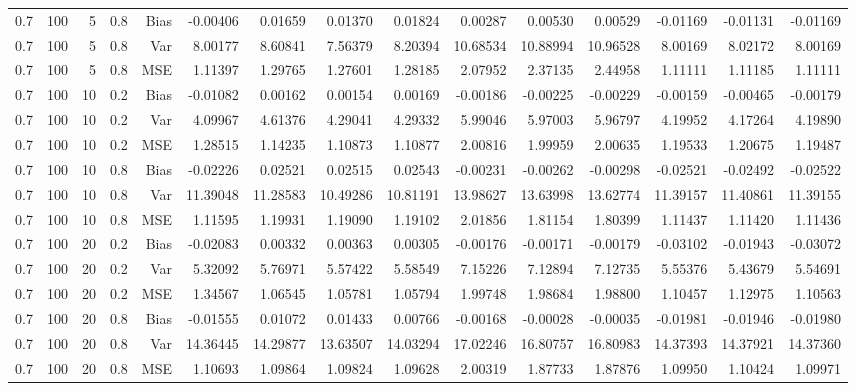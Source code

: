 \begin{table}[!htbp]
\begin{tabular}{lrrrrrrrrrrrrrr}
0.7 & 100 &  5 & 0.8 & Bias & -0.00406 & 0.01659 & 0.01370 & 0.01824 & 0.00287 & 0.00530 & 0.00529 & -0.01169 & -0.01131 & -0.01169 \\
0.7 & 100 &  5 & 0.8 & Var & 8.00177 & 8.60841 & 7.56379 & 8.20394 & 10.68534 & 10.88994 & 10.96528 & 8.00169 & 8.02172 & 8.00169 \\
0.7 & 100 &  5 & 0.8 & MSE & 1.11397 & 1.29765 & 1.27601 & 1.28185 & 2.07952 & 2.37135 & 2.44958 & 1.11111 & 1.11185 & 1.11111 \\
0.7 & 100 & 10 & 0.2 & Bias & -0.01082 & 0.00162 & 0.00154 & 0.00169 & -0.00186 & -0.00225 & -0.00229 & -0.00159 & -0.00465 & -0.00179 \\
0.7 & 100 & 10 & 0.2 & Var & 4.09967 & 4.61376 & 4.29041 & 4.29332 & 5.99046 & 5.97003 & 5.96797 & 4.19952 & 4.17264 & 4.19890 \\
0.7 & 100 & 10 & 0.2 & MSE & 1.28515 & 1.14235 & 1.10873 & 1.10877 & 2.00816 & 1.99959 & 2.00635 & 1.19533 & 1.20675 & 1.19487 \\
0.7 & 100 & 10 & 0.8 & Bias & -0.02226 & 0.02521 & 0.02515 & 0.02543 & -0.00231 & -0.00262 & -0.00298 & -0.02521 & -0.02492 & -0.02522 \\
0.7 & 100 & 10 & 0.8 & Var & 11.39048 & 11.28583 & 10.49286 & 10.81191 & 13.98627 & 13.63998 & 13.62774 & 11.39157 & 11.40861 & 11.39155 \\
0.7 & 100 & 10 & 0.8 & MSE & 1.11595 & 1.19931 & 1.19090 & 1.19102 & 2.01856 & 1.81154 & 1.80399 & 1.11437 & 1.11420 & 1.11436 \\
0.7 & 100 & 20 & 0.2 & Bias & -0.02083 & 0.00332 & 0.00363 & 0.00305 & -0.00176 & -0.00171 & -0.00179 & -0.03102 & -0.01943 & -0.03072 \\
0.7 & 100 & 20 & 0.2 & Var & 5.32092 & 5.76971 & 5.57422 & 5.58549 & 7.15226 & 7.12894 & 7.12735 & 5.55376 & 5.43679 & 5.54691 \\
0.7 & 100 & 20 & 0.2 & MSE & 1.34567 & 1.06545 & 1.05781 & 1.05794 & 1.99748 & 1.98684 & 1.98800 & 1.10457 & 1.12975 & 1.10563 \\
0.7 & 100 & 20 & 0.8 & Bias & -0.01555 & 0.01072 & 0.01433 & 0.00766 & -0.00168 & -0.00028 & -0.00035 & -0.01981 & -0.01946 & -0.01980 \\
0.7 & 100 & 20 & 0.8 & Var & 14.36445 & 14.29877 & 13.63507 & 14.03294 & 17.02246 & 16.80757 & 16.80983 & 14.37393 & 14.37921 & 14.37360 \\
0.7 & 100 & 20 & 0.8 & MSE & 1.10693 & 1.09864 & 1.09824 & 1.09628 & 2.00319 & 1.87733 & 1.87876 & 1.09950 & 1.10424 & 1.09971 \\

\end{tabular}
\end{table}
